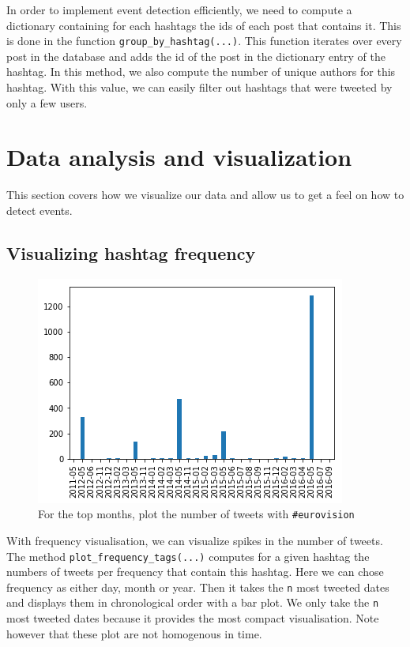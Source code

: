 \documentclass[11pt]{article}
\begin{document}
In order to implement event detection efficiently, we need to compute a dictionary containing for each hashtags the ids of each post that contains it. This is done in the function \texttt{group\_by\_hashtag(...)}. This function iterates over every post in the database and adds the id of the post in the dictionary entry of the hashtag. In this method, we also compute the number of unique authors for this hashtag. With this value, we can easily filter out hashtags that were tweeted by only a few users.


\section{Data analysis and visualization}

This section covers how we visualize our data and allow us to get a feel on how to detect events.

\subsection{Visualizing hashtag frequency}

\begin{figure}[htbp]
  \vspace*{-1mm}
  \centering
  \includegraphics[width=\columnwidth]{figures/freq_month_eurovision.png}
  \vspace{-5mm}
  \caption{For the top months, plot the number of tweets with  \texttt{\#eurovision}}
  \label{fig:freq_month_eurovision}
\end{figure}

With frequency visualisation, we can visualize spikes in the number of tweets. The method \texttt{plot\_frequency\_tags(...)} computes for a given hashtag the numbers of tweets per frequency that contain this hashtag. Here we can chose frequency as either day, month or year. Then it takes the \texttt{n} most tweeted dates and displays them in chronological order with a bar plot. We only take the \texttt{n} most tweeted dates because it provides the most compact visualisation. Note however that these plot are not homogenous in time. 
\end{document}
